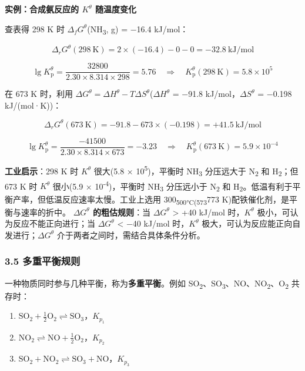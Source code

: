 \textbf{实例：合成氨反应的 \(K^\theta\) 随温度变化}

查表得 298 K 时 \(\Delta_f G^\theta\)(NH\textsubscript{3}, g) = −16.4 kJ/mol：

\[
\Delta_r G^\theta(298\ \mathrm{K}) = 2 \times (-16.4) - 0 - 0 = -32.8\ \mathrm{kJ/mol}
\]

\[
\lg K_{\mathrm p}^\theta = \frac{32800}{2.30 \times 8.314 \times 298} = 5.76 \quad \Rightarrow \quad K_{\mathrm p}^\theta(298\ \mathrm{K}) = 5.8 \times 10^5
\]

在 673 K 时，利用 \(\Delta G^\theta = \Delta H^\theta - T\Delta S^\theta\)(\(\Delta H^\theta\) = −91.8 kJ/mol，\(\Delta S^\theta\) = −0.198 kJ/(mol·K))：

\[
\Delta_r G^\theta(673\ \mathrm{K}) = -91.8 - 673 \times (-0.198) = +41.5\ \mathrm{kJ/mol}
\]

\[
\lg K_{\mathrm p}^\theta = \frac{-41500}{2.30 \times 8.314 \times 673} = -3.23 \quad \Rightarrow \quad K_{\mathrm p}^\theta(673\ \mathrm{K}) = 5.9 \times 10^{-4}
\]

\textbf{工业启示}：298 K 时 \(K^\theta\) 很大(5.8 × 10\textsuperscript{5})，平衡时 NH\textsubscript{3} 分压远大于 N\textsubscript{2} 和 H\textsubscript{2}；但 673 K 时 \(K^\theta\) 很小(5.9 × 10\textsuperscript{-4})，平衡时 NH\textsubscript{3} 分压远小于 N\textsubscript{2} 和 H\textsubscript{2}。低温有利于平衡产率，但低温反应速率太慢。工业上选用 300\textsubscript{500°C(573}773 K)配铁催化剂，是平衡与速率的折中。
\textbf{\(\Delta G^\theta\) 的粗估规则}：当 \(\Delta G^\theta\) \textgreater{} +40 kJ/mol 时，\(K^\theta\) 极小，可认为反应不能正向进行；当 \(\Delta G^\theta\) \textless{} −40 kJ/mol 时，\(K^\theta\) 极大，可认为反应能正向自发进行；\(\Delta G^\theta\) 介于两者之间时，需结合具体条件分析。

\subsubsection{3.5 多重平衡规则}\label{ux591aux91cdux5e73ux8861ux89c4ux5219}

一种物质同时参与几种平衡，称为\textbf{多重平衡}。例如 SO\textsubscript{2}、SO\textsubscript{3}、NO、NO\textsubscript{2}、O\textsubscript{2} 共存时：

\begin{enumerate}
\def\labelenumi{\arabic{enumi}.}
\tightlist
\item
  \(\mathrm{SO_2 + \frac{1}{2}O_2 \rightleftharpoons SO_3}\)，\(K_{p_1}\)
\item
  \(\mathrm{NO_2 \rightleftharpoons NO + \frac{1}{2}O_2}\)，\(K_{p_2}\)
\item
  \(\mathrm{SO_2 + NO_2 \rightleftharpoons SO_3 + NO}\)，\(K_{p_3}\)
\end{enumerate}

